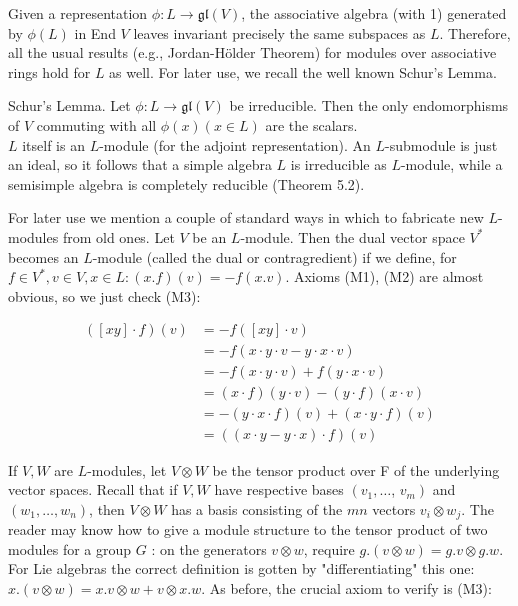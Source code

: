 \documentclass[10pt]{article}
\begin{document}
Given a representation $\phi: L \rightarrow \mathfrak{g l}(V)$, the associative algebra (with 1) generated by $\phi(L)$ in End $V$ leaves invariant precisely the same subspaces as $L$. Therefore, all the usual results (e.g., Jordan-Hölder Theorem) for modules over associative rings hold for $L$ as well. For later use, we recall the well known Schur's Lemma.

Schur's Lemma. Let $\phi: L \rightarrow \mathfrak{g l}(V)$ be irreducible. Then the only endomorphisms of $V$ commuting with all $\phi(x)(x \in L)$ are the scalars.\\
$L$ itself is an $L$-module (for the adjoint representation). An $L$-submodule is just an ideal, so it follows that a simple algebra $L$ is irreducible as $L$-module, while a semisimple algebra is completely reducible (Theorem 5.2).

For later use we mention a couple of standard ways in which to fabricate new $L$-modules from old ones. Let $V$ be an $L$-module. Then the dual vector space $V^{*}$ becomes an $L$-module (called the dual or contragredient) if we define, for $f \in V^{*}, v \in V, x \in L:(x . f)(v)=-f(x . v)$. Axioms (M1), (M2) are almost obvious, so we just check (M3):

$$
\begin{aligned}
([x y] \cdot f)(v) & =-f([x y] \cdot v) \\
& =-f(x \cdot y \cdot v-y \cdot x \cdot v) \\
& =-f(x \cdot y \cdot v)+f(y \cdot x \cdot v) \\
& =(x \cdot f)(y \cdot v)-(y \cdot f)(x \cdot v) \\
& =-(y \cdot x \cdot f)(v)+(x \cdot y \cdot f)(v) \\
& =((x \cdot y-y \cdot x) \cdot f)(v)
\end{aligned}
$$

If $V, W$ are $L$-modules, let $V \otimes W$ be the tensor product over F of the underlying vector spaces. Recall that if $V, W$ have respective bases $\left(v_{1}, \ldots\right.$, $\left.v_{m}\right)$ and $\left(w_{1}, \ldots, w_{n}\right)$, then $V \otimes W$ has a basis consisting of the $m n$ vectors $v_{i} \otimes w_{j}$. The reader may know how to give a module structure to the tensor product of two modules for a group $G$ : on the generators $v \otimes w$, require $g .(v \otimes w)=g . v \otimes g . w$. For Lie algebras the correct definition is gotten by "differentiating" this one: $x .(v \otimes w)=x . v \otimes w+v \otimes x . w$. As before, the crucial axiom to verify is (M3):
\end{document}

